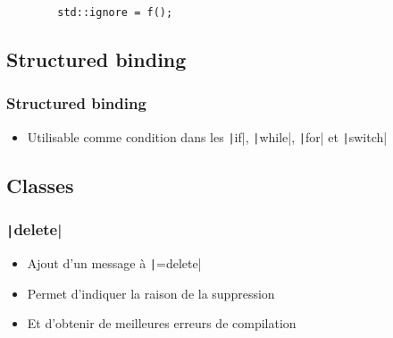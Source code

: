 \documentclass[C++.tex]{subfiles}
\begin{document}
\begin{frame}[fragile]
	\begin{verbatim}
		std::ignore = f();
	\end{verbatim}


\end{frame}

\subsection*{Structured binding}
\begin{frame}[fragile]
	\frametitle{Structured binding}
	\begin{itemize}
		\item Utilisable comme condition dans les \texttt|if|, \texttt|while|, \texttt|for| et \texttt|switch|
	\end{itemize}

\end{frame}

\subsection*{Classes}
\begin{frame}[fragile]
	\frametitle{\texttt|delete|}
	\begin{itemize}
		\item Ajout d'un message à \texttt|=delete|
		\item Permet d'indiquer la raison de la suppression
		\item Et d'obtenir de meilleures erreurs de compilation
	\end{itemize}

\end{frame}
\end{document}
